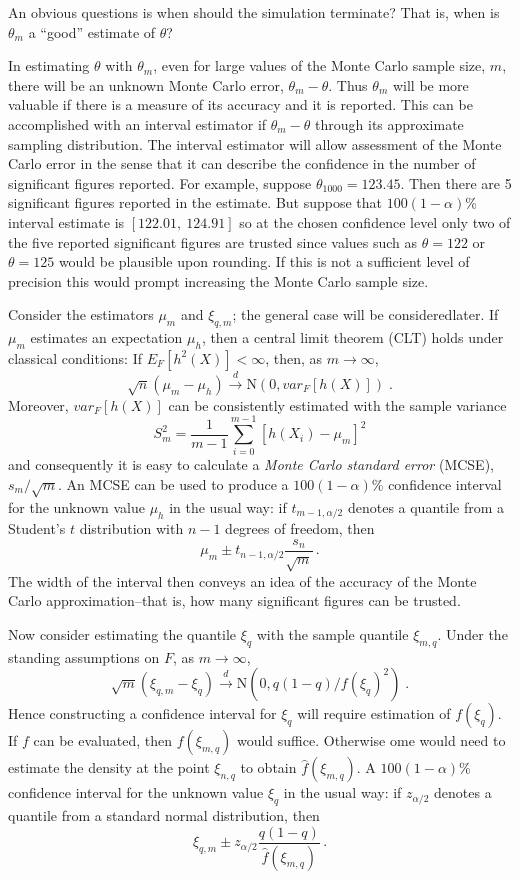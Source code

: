 \documentclass[12pt]{article}
\theoremstyle{plain}
\theoremstyle{definition}
\theoremstyle{remark}
\begin{document}
An obvious questions is when should the simulation terminate?  That
is, when is $\theta_m$ a ``good'' estimate of $\theta$?

In estimating $\theta$ with $\theta_m$, even for large values of the
Monte Carlo sample size, $m$, there will be an unknown Monte Carlo
error, $\theta_{m} - \theta$. Thus $\theta_{m}$ will be more valuable
if there is a measure of its accuracy and it is reported.  This can be
accomplished with an interval estimator if $\theta_m - \theta$ through
its approximate sampling distribution. The interval estimator will
allow assessment of the Monte Carlo error in the sense that it can
describe the confidence in the number of significant figures reported.
For example, suppose $\theta_{1000}=123.45$.  Then there are 5
significant figures reported in the estimate. But suppose that
$100(1-\alpha)$\% interval estimate is $[122.01,~124.91]$ so at the
chosen confidence level only two of the five reported
significant figures are trusted since values such as $\theta=122$ or $\theta=125$
would be plausible upon rounding.  If this is not a sufficient level
of precision this would prompt increasing the Monte Carlo sample
size.

Consider the estimators $\mu_m$ and $\xi_{q,m}$; the general case will
be consideredlater. If $\mu_m$ estimates
an expectation $\mu_h$, then a central limit theorem (CLT) holds under
classical conditions: If $E_{F} [h^{2}(X)] < \infty$, then, as $m \to
\infty$,
\begin{equation}
\label{gofmc:eq:iid clt}
\sqrt{n}(\mu_{m} - \mu_{h}) \stackrel{d}{\to} \text{N}(0,var_{F}[h(X)])
\; .
\end{equation}
Moreover, $var_{F}[h(X)]$ can be consistently estimated with the sample
variance
\[
S_{m}^{2} = \frac{1}{m-1} \sum_{i=0}^{m-1} [ h(X_{i}) - \mu_{m}]^{2}
\] 
and consequently it is easy to calculate a \textit{Monte Carlo
  standard error} (MCSE), $s_{m} / \sqrt{m}$.  An MCSE can be used to
produce a $100(1-\alpha)$\% confidence interval for the unknown value
$\mu_{h}$ in the usual way: if $t_{m-1, \alpha/2}$ denotes a quantile
from a Student's $t$ distribution with $n-1$ degrees of freedom, then
\[
\mu_{m} \pm t_{n-1, \alpha/2} \frac{s_{n}}{\sqrt{m}}\, .
\]
The width of the interval then conveys an idea of the accuracy of the
Monte Carlo approximation--that is, how many significant figures can
be trusted.

Now consider estimating the quantile $\xi_{q}$ with the sample
quantile $\xi_{m,q}$.  Under the standing assumptions on $F$, as
$m \to \infty$,
\[
\sqrt{m}( \xi_{q,m} - \xi_{q}) \stackrel{d}{\to} \text{N}(0,
q(1-q)/f(\xi_{q})^{2}) \; . 
\]
Hence constructing a confidence interval for $\xi_{q}$ will require
estimation of $f(\xi_{q})$.  If $f$ can be evaluated, then $f(\xi_{m,
  q})$ would suffice.  Otherwise ome would need to estimate the density
at the  point  $\xi_{n, q}$ to obtain $\hat{f}(\xi_{m, q})$.  A 
 $100(1-\alpha)$\% confidence interval for the unknown value
$\xi_q$ in the usual way: if $z_{\alpha/2}$ denotes a quantile
from a standard normal distribution, then
\[
\xi_{q,m} \pm z_{\alpha/2} \frac{q(1-q)}{\hat{f}(\xi_{m, q})}\, .
\]
\end{document}
